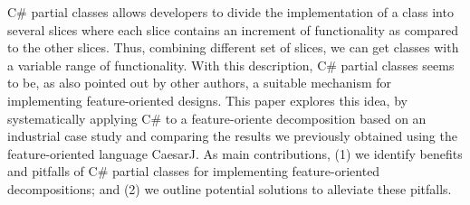 C\# partial classes allows developers to divide the implementation of a class into several slices where each slice contains an increment of functionality as compared to the other slices. Thus, combining different set of slices, we can get classes with a variable range of functionality. With this description, C\# partial classes seems to be, as also pointed out by other authors, a suitable mechanism for implementing feature-oriented designs. This paper explores this idea, by systematically applying C\# to a feature-oriente decomposition based on an industrial case study and comparing the results we previously obtained using the feature-oriented language CaesarJ. As main contributions, (1) we identify benefits and pitfalls of C\# partial classes for implementing feature-oriented decompositions; and (2) we outline potential solutions to alleviate these pitfalls. 